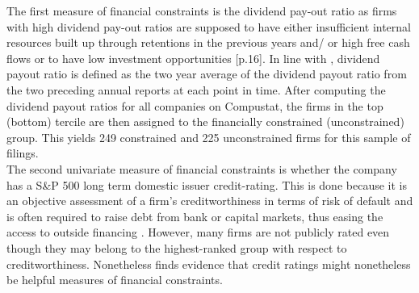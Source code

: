 \documentclass[12pt]{article}
\begin{document}
The first measure of financial constraints is the dividend pay-out ratio as firms with high dividend pay-out ratios are supposed to have either insufficient internal resources built up through retentions in the previous years and/ or high free cash flows or to have low investment opportunities [p.16]\citep{heller2015}. In line with \citet[p.119]{Khatami2014}, dividend payout ratio is defined as the two year average of the dividend payout ratio from the two preceding annual reports at each point in time.  After computing the dividend payout ratios for all companies on Compustat, the firms in the top (bottom) tercile are then assigned to the financially constrained (unconstrained) group. This yields 249 constrained and 225 unconstrained firms for this sample of filings.\\
The second univariate measure of financial constraints is whether the company has a S\&P 500 long term domestic issuer credit-rating. This is done because it is an objective assessment of a firm's creditworthiness in terms of risk of default and is often required to raise debt from bank or capital markets, thus easing the access to outside financing \citep[p.18]{heller2015}. However, many firms are not publicly rated even though they may belong to the highest-ranked group with respect to creditworthiness. Nonetheless \citet[p.175]{heller2015} finds evidence that credit ratings might nonetheless be helpful measures of financial constraints. 
\end{document}
